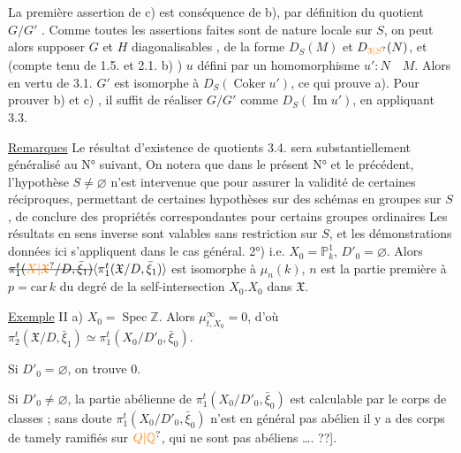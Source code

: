 La première assertion de c) est conséquence de b), par définition
du quotient $G/G'$ . Comme toutes les assertions faites sont de nature
locale sur $S$, on peut alors supposer $G$ et $H$  diagonalisables ,  de la forme $D_S(M)$ et $D_{\unsure{3|S}}(N)$, et (compte tenu de 1.5.
et 2.1. b) ) $u$ défini par un homomorphisme $u':N\quad M$. Alors en
vertu de 3.1. $G'$ est isomorphe à $D_S(\operatorname{Coker}u')$, ce qui prouve a). Pour
prouver b) et c) , il suffit de réaliser $G/G'$ comme $D_S(\operatorname{Im}u')$, en
appliquant 3.3.

\uline{Remarques} Le résultat d'existence de quotients 3.4. sera substantiellement généralisé au N° suivant,  On notera que dans le présent
N° et le précédent, l'hypothèse $S\ne\varnothing$ n'est intervenue que pour assurer la validité de certaines réciproques,  permettant de certaines hypothèses sur des schémas en groupes sur $S$, de
conclure des propriétés correspondantes pour certains groupes ordinaires
Les résultats en sens inverse sont valables sans restriction sur $S$, et
les démonstrations données ici s'appliquent dans le cas général.
2°)  i.e. $X_0=\mathbb P^1_k$, $D'_0=\varnothing$. Alors
$\deleted{\pi_1^t(\unsure{X|\mathfrak X}/D,\bar\xi_1)}\inserted{\pi_1^t(\mathfrak X/D,\bar\xi_1)}$ est  isomorphe à
$\mu_n(k)$,  $n$ est la partie première à
$p=\mathrm{car}\,k$ du degré de la self-intersection $X_0.X_0$ dans $\mathfrak X$.

\uline{Exemple} II a) $X_0=\operatorname{Spec}\mathbb Z$.  Alors $\mu^\infty_{t,X_0}=0$,
d'où $\pi^t_2(\mathfrak X/D,\bar\xi_1)\simeq\pi_1^t(X_0/D'_0,\bar\xi_0)$.

 Si $D'_0=\varnothing$, on trouve $0$.

Si $D'_0\ne\varnothing$, la partie abélienne de
$\pi_1^t(X_0/D'_0,\bar\xi_0)$ est calculable par le corps de
classes  ; sans doute $\pi_1^t(X_0/D'_0,\bar\xi_0)$ n'est
en général pas abélien \unsure{[i.e.} il y a des 
 corps de  tamely ramifiés
sur $\unsure{Q|\mathbb Q}$, qui ne sont pas abéliens \ldots. ??].

